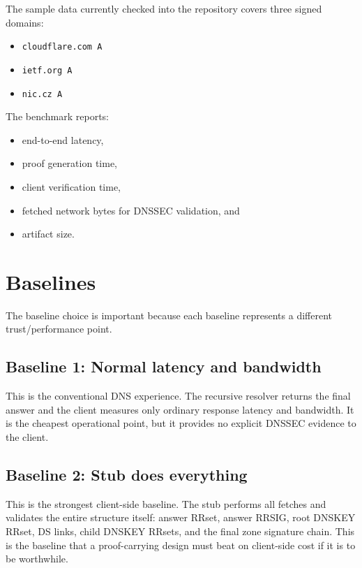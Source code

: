 \documentclass[11pt]{article}
\begin{document}
The sample data currently checked into the repository covers three signed domains:

\begin{itemize}[nosep]
    \item \texttt{cloudflare.com A}
    \item \texttt{ietf.org A}
    \item \texttt{nic.cz A}
\end{itemize}

The benchmark reports:

\begin{itemize}[nosep]
    \item end-to-end latency,
    \item proof generation time,
    \item client verification time,
    \item fetched network bytes for DNSSEC validation, and
    \item artifact size.
\end{itemize}

\section{Baselines}

The baseline choice is important because each baseline represents a different trust/performance point.

\subsection*{Baseline 1: Normal latency and bandwidth}

This is the conventional DNS experience. The recursive resolver returns the final answer and the client measures only ordinary response latency and bandwidth. It is the cheapest operational point, but it provides no explicit DNSSEC evidence to the client.

\subsection*{Baseline 2: Stub does everything}

This is the strongest client-side baseline. The stub performs all fetches and validates the entire structure itself: answer RRset, answer RRSIG, root DNSKEY RRset, DS links, child DNSKEY RRsets, and the final zone signature chain. This is the baseline that a proof-carrying design must beat on client-side cost if it is to be worthwhile.
\end{document}
